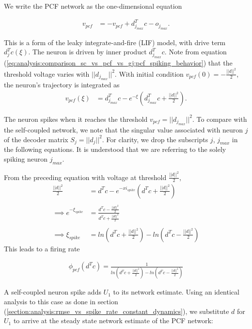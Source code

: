 \begin{enumerate}
We write the PCF network as the one-dimensional equation

\begin{align*}
	v_{pcf} &= 
	- v_{pcf}
	+ d_{j_{max}}^T c 
	- o_{j_{max}}.
\end{align*}

This is a form of the leaky integrate-and-fire (LIF) model, with drive term $d_j^T c(\xi)$. The neuron is driven by inner product $d_{j_{max}}^T c$. Note from equation (\ref{eq:analysis:comparison_sc_vs_pcf_vs_gj:pcf_spiking_behavior}) that the threshold voltage varies with $||d_{j_{max}}||^2$. With initial condition $v_{pcf}(0) = - \frac{||d||^2}{2}$, the neuron's trajectory is integrated as 
\begin{align*}
	v_{pcf}(\xi)
	&= 
	d_{j_{max}}^T c - e^{-\xi} 
	\left(
		d_{j_{max}}^T c + \frac{||d||^2}{2}
	\right). 
\end{align*}

The neuron spikes when it reaches the threshold $v_{pcf} = ||d_{j_{max}}||^2$. To compare with the self-coupled network, we note that the singular value associated with neuron $j$ of the decoder matrix $S_j = ||d_j||^2$. For clarity, we drop the subscripts $j$, $j_{max}$ in the following equations. It is understood that we are referring to the solely spiking neuron $j_{max}$.

From the preceding equation with voltage at  threshold $\frac{||d||^2}{2}$,
\begin{align*}
	\frac{||d||^2}{2}
	&= 
	d^T c - e^{-xi_{spike}} 
	\left(
		d^T c + \frac{||d||^2}{2}
	\right)
	\\
	\\
	\implies
	e^{-\xi_{spike}}
	&= 
		\frac
	{
		d^T c - \frac{||d||^2}{2}
	}
	{
		d^T c + \frac{||d||^2}{2}
	}
	\\
	\\
	\implies
	\xi_{spike}
	&= 
	ln
	\left(
		d^T c + \frac{||d||^2}{2}
	\right)
	-
	ln
	\left(
		d^T c - \frac{||d||^2}{2}
	\right)		
\end{align*}
This leads to a firing rate 

\begin{align}
\label{eq:analysis:comparison_sc_vs_pcf_vs_gj:const_dynamics:pcf_spike_rate}
	\phi_{pcf}
	\left(
		d^T c
	\right)
	 =
	 \frac
	 {
	 	1
	 }
	 {
		ln
		\left(
			d^T c + \frac{||d||^2}{2}
		\right)
		-
		ln
		\left(
			d^T c - \frac{||d||^2}{2}
		\right)		
	}
\end{align}


A self-coupled neuron spike adds $U_1$ to its network estimate. Using an identical analysis to this case as done in section (\ref{section:analysis:rmse_vs_spike_rate_constant_dynamics}), we substitute $d$ for $U_1$ to arrive at the steady state network estimate of the PCF network:


\end{enumerate}
